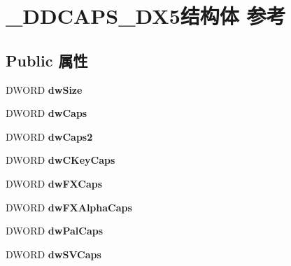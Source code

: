 \hypertarget{struct___d_d_c_a_p_s___d_x5}{}\section{\+\_\+\+D\+D\+C\+A\+P\+S\+\_\+\+D\+X5结构体 参考}
\label{struct___d_d_c_a_p_s___d_x5}
\subsection*{Public 属性}
\begin{DoxyCompactItemize}
\item 
\mbox{\label{struct___d_d_c_a_p_s___d_x5_ab39273a0d4f1a8693814d6985eee54ae}} 
D\+W\+O\+RD {\bfseries dw\+Size}
\item 
\mbox{\label{struct___d_d_c_a_p_s___d_x5_a1cb61aa7dd754520b921f6926cfb1334}} 
D\+W\+O\+RD {\bfseries dw\+Caps}
\item 
\mbox{\label{struct___d_d_c_a_p_s___d_x5_a26f6062e30ec30f41eab751b7f800588}} 
D\+W\+O\+RD {\bfseries dw\+Caps2}
\item 
\mbox{\label{struct___d_d_c_a_p_s___d_x5_a06e8d976d0df84980222e28fbc53bf0b}} 
D\+W\+O\+RD {\bfseries dw\+C\+Key\+Caps}
\item 
\mbox{\label{struct___d_d_c_a_p_s___d_x5_a73128de34193abbf7f7ffa49deddc509}} 
D\+W\+O\+RD {\bfseries dw\+F\+X\+Caps}
\item 
\mbox{\label{struct___d_d_c_a_p_s___d_x5_aef86f7f3cc388b014a8dba2238183f7d}} 
D\+W\+O\+RD {\bfseries dw\+F\+X\+Alpha\+Caps}
\item 
\mbox{\label{struct___d_d_c_a_p_s___d_x5_aac8a0fb8eb205a82104f2b7ddc79f52d}} 
D\+W\+O\+RD {\bfseries dw\+Pal\+Caps}
\item 
\mbox{\label{struct___d_d_c_a_p_s___d_x5_a8218b82ad858e426a86e0170b330a8fd}} 
D\+W\+O\+RD {\bfseries dw\+S\+V\+Caps}
\item 
\mbox{\label{struct___d_d_c_a_p_s___d_x5_aa8f966a5e254b941b2dfd04efe5a4de9}} 

\end{DoxyCompactItemize}
